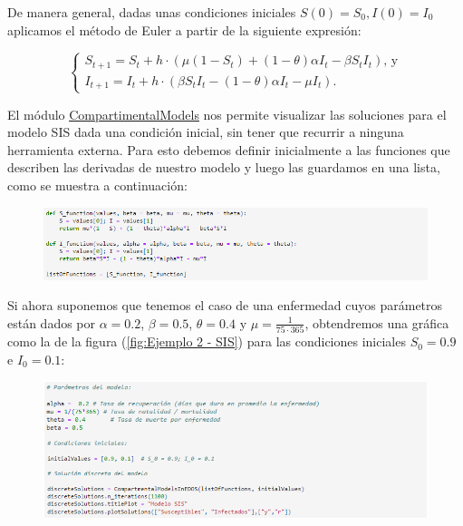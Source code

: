De manera general, dadas unas condiciones iniciales $S(0)=S_0,I(0)=I_0$ aplicamos el método de Euler a partir de la siguiente expresión:

$$\left\{\begin{array}{l}
S_{t+1} = S_t + h\cdot(\mu(1 - S_t) + (1 - \theta)\alpha I_t - \beta S_t I_t )\text{, y} \\
I_{t+1} = I_t + h\cdot(\beta S_t I_t - (1 - \theta)\alpha I_t - \mu I_t).
\end{array}\right.$$

El módulo \href{https://github.com/Grupo-de-simulacion-con-automatas/Prediccion-del-comportamiento-de-una-enfermedad-simulada-en-AC-con-un-algoritmo-en-RN/blob/master/Codigo/1.\%20Modelos\%20compartimentales\%20en\%20ecuaciones\%20diferenciales.ipynb}{\underline{CompartimentalModels}} nos permite visualizar las soluciones para el modelo SIS dada una condición inicial, sin tener que recurrir a ninguna herramienta externa. Para esto debemos definir inicialmente a las funciones que describen las derivadas de nuestro modelo y luego las guardamos en una lista, como se muestra a continuación:

\begin{figure}[h]
    \includegraphics[width=1\textwidth]{Imagenes/compartimentalModels1.png}
\end{figure}

Si ahora suponemos que tenemos el caso de una enfermedad cuyos parámetros están dados por $\alpha=0.2$, $\beta=0.5$, $\theta=0.4$ y $\mu=\frac{1}{75\cdot365}$, obtendremos una gráfica como la de la figura (\ref{fig:Ejemplo 2 - SIS}) para las condiciones iniciales $S_0=0.9$ e $I_0=0.1$:

\begin{figure}[h]
    \includegraphics[width=1\textwidth]{Imagenes/compartimentalModels2.png}
\end{figure}
    
